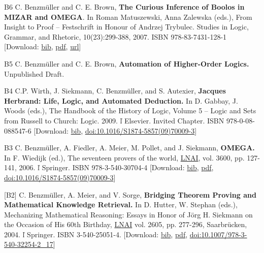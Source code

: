 \documentclass{article}
\newcommand{\tmstrong}[1]{\textbf{#1}}
\newcommand{\tmtextbf}[1]{{\bfseries{#1}}}
\begin{document}
  \item [B6] C. Benzm\"uller and C. E. Brown, {\tmstrong{The Curious Inference
  of Boolos in MIZAR and OMEGA}}. In Roman Matuszewski, Anna Zalewska (eds.),
  From Insight to Proof -- Festschrift in Honour of Andrzej Trybulec. Studies
  in Logic, Grammar, and Rhetoric, 10(23):299-388, 2007. ISBN
  978-83-7431-128-1 {\color{grey} [Download: {\small
  \href{../papers/B6.bib}{bib}}, {\small \href{../papers/B6.pdf}{pdf}},
  {\small \href{http://logika.uwb.edu.pl/studies/vol23.html}{url}}]}
  
  \item [B5] C. Benzm\"uller and C. E. Brown, {\tmstrong{{\color{black}
  Automation of Higher-Order Logics}.}} Unpublished Draft.
  
  \item [B4] C.P. Wirth, J. Siekmann, C. Benzm\"uller, and S. Autexier,
  {\tmstrong{{\color{black} Jacques Herbrand: Life, Logic, and Automated
  Deduction}.}} In D. Gabbay, J. Woods (eds.), The Handbook of the History of
  Logic, Volume 5 -- Logic and Sets from Russell to Church: Logic. 2009. 
  \v{l}  Elsevier. Invited Chapter. ISBN 978-0-08-088547-6 {\color{grey}
  [Download: {\small \href{../papers/B4.bib}{bib}}, {\small
  \href{http://dx.doi.org/10.1016/S1874-5857(09)70009-3}{doi:10.1016/S1874-5857(09)70009-3}}]}
  
  \item [B3] {\small C. Benzm\"uller, A. Fiedler, A. Meier, M. Pollet, and J.
  Siekmann, \tmtextbf{OMEGA.}} {\small In F. Wiedijk (ed.), The seventeen
  provers of the world, \href{http://www.springer.de/comp/lncs/}{LNAI}, vol.
  3600, pp. 127-141,} 2006.  \v{l}  Springer. ISBN 978-3-540-30704-4
  {\color{grey} [Download: {\small \href{../papers/B3.bib}{bib}}, {\small
  \href{../papers/B3.pdf}{pdf}}, {\small
  \href{http://dx.doi.org/10.1007/11542384\_17}{doi:10.1016/S1874-5857(09)70009-3}}]}
  
  \item {\small [B2] C. Benzm\"uller, A. Meier, and V. Sorge,
  \tmtextbf{Bridging Theorem Proving and Mathematical Knowledge Retrieval.}}
  {\small In D. Hutter, W. Stephan (eds.), Mechanizing Mathematical Reasoning:
  Essays in Honor of J\"org H. Siekmann on the Occasion of His 60th Birthday,
  \href{http://www.springer.de/comp/lncs/index.html}{LNAI} vol. 2605, pp.
  277-296, Saarbr\"ucken, 2004.  \v{l}  Springer.} ISBN 3-540-25051-4.
  {\color{grey} [Download: {\small \href{../papers/B2.bib}{bib},
  \href{../papers/B2.pdf}{pdf}}, {\small
  \href{http://dx.doi.org/10.1007/978-3-540-32254-2\_17}{doi:10.1007/978-3-540-32254-2\_17}}]}
  
\end{document}
